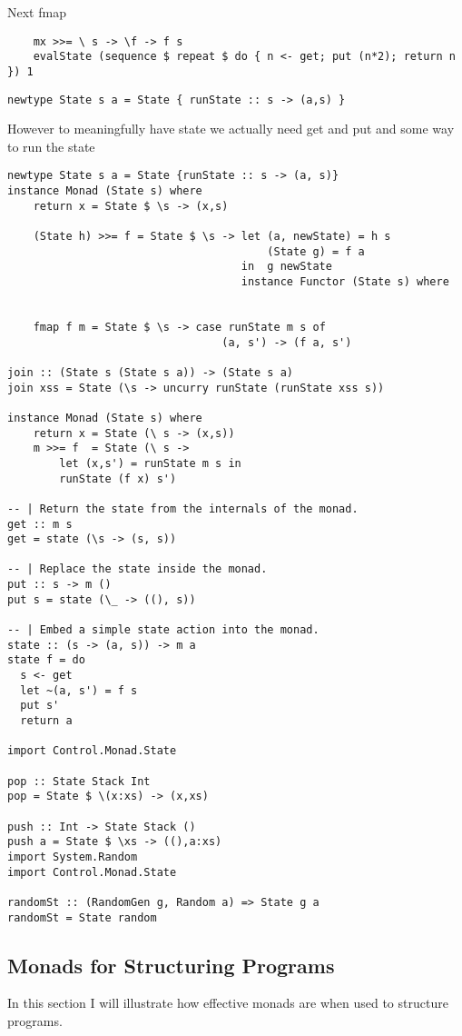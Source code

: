 Next fmap

\begin{verbatim}
    mx >>= \ s -> \f -> f s
    evalState (sequence $ repeat $ do { n <- get; put (n*2); return n }) 1
\end{verbatim}

\begin{verbatim}
newtype State s a = State { runState :: s -> (a,s) }  
\end{verbatim}

However to meaningfully have state we actually need
get and put
and some way to run the state

\begin{verbatim}
newtype State s a = State {runState :: s -> (a, s)}
instance Monad (State s) where
    return x = State $ \s -> (x,s)

    (State h) >>= f = State $ \s -> let (a, newState) = h s
                                        (State g) = f a
                                    in  g newState
                                    instance Functor (State s) where


    fmap f m = State $ \s -> case runState m s of
                                 (a, s') -> (f a, s')

join :: (State s (State s a)) -> (State s a)
join xss = State (\s -> uncurry runState (runState xss s))

instance Monad (State s) where
    return x = State (\ s -> (x,s))
    m >>= f  = State (\ s ->
        let (x,s') = runState m s in
        runState (f x) s')

-- | Return the state from the internals of the monad.
get :: m s
get = state (\s -> (s, s))

-- | Replace the state inside the monad.
put :: s -> m ()
put s = state (\_ -> ((), s))

-- | Embed a simple state action into the monad.
state :: (s -> (a, s)) -> m a
state f = do
  s <- get
  let ~(a, s') = f s
  put s'
  return a

import Control.Monad.State

pop :: State Stack Int
pop = State $ \(x:xs) -> (x,xs)

push :: Int -> State Stack ()
push a = State $ \xs -> ((),a:xs)
import System.Random
import Control.Monad.State

randomSt :: (RandomGen g, Random a) => State g a
randomSt = State random
\end{verbatim}

\subsection{Monads for Structuring Programs}
In this section I will illustrate how effective monads are when used to structure programs.

